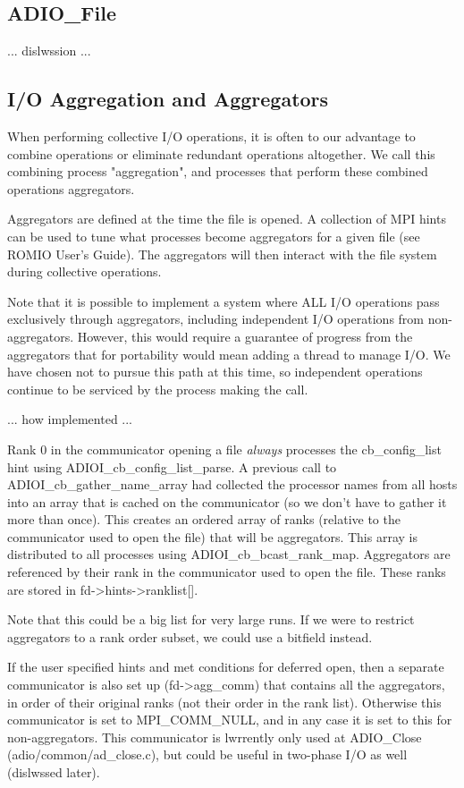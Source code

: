 \subsection{ADIO\_File}

... dislwssion ...

\subsection{I/O Aggregation and Aggregators}

When performing collective I/O operations, it is often to our advantage to
combine operations or eliminate redundant operations altogether.  We call this
combining process "aggregation", and processes that perform these combined
operations aggregators.

Aggregators are defined at the time the file is opened.  A collection of MPI
hints can be used to tune what processes become aggregators for a given file
(see ROMIO User's Guide).  The aggregators will then interact with the file
system during collective operations.

Note that it is possible to implement a system where ALL I/O operations pass
exclusively through aggregators, including independent I/O operations from
non-aggregators.  However, this would require a guarantee of progress from the
aggregators that for portability would mean adding a thread to manage I/O.  We
have chosen not to pursue this path at this time, so independent operations
continue to be serviced by the process making the call.

... how implemented ...

Rank 0 in the communicator opening a file \emph{always} processes the
cb\_config\_list hint using ADIOI\_cb\_config\_list\_parse.  A previous call to
ADIOI\_cb\_gather\_name\_array had collected the processor names from all hosts
into an array that is cached on the communicator (so we don't have to gather
it more than once).  This creates an ordered array of ranks (relative to the
communicator used to open the file) that will be aggregators.  This array is
distributed to all processes using ADIOI\_cb\_bcast\_rank\_map.  Aggregators are
referenced by their rank in the communicator used to open the file.  These
ranks are stored in fd->hints->ranklist[].

Note that this could be a big list for very large runs.  If we were to
restrict aggregators to a rank order subset, we could use a bitfield instead.

If the user specified hints and met conditions for deferred open, then a
separate communicator is also set up (fd->agg\_comm) that contains all the
aggregators, in order of their original ranks (not their order in the rank
list).  Otherwise this communicator is set to MPI\_COMM\_NULL, and in any case
it is set to this for non-aggregators.  This communicator is lwrrently only
used at ADIO\_Close (adio/common/ad\_close.c), but could be useful in two-phase
I/O as well (dislwssed later).


